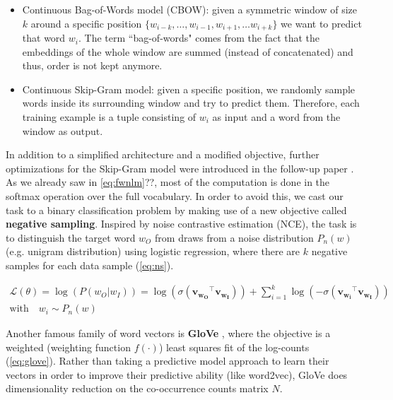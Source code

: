 \begin{itemize}
	\item Continuous Bag-of-Words model (CBOW): given a symmetric window of size $k$ around a specific position $\{w_{i-k}, \ldots , w_{i-1}, w_{i+1}, \ldots w_{i+k}\}$ we want to predict that word $w_i$. The term ``bag-of-words" comes from the fact that the embeddings of the whole window are summed (instead of concatenated) and thus, order is not kept anymore.
	
	\item Continuous Skip-Gram model: given a specific position, we randomly sample words inside its surrounding window and try to predict them. Therefore, each training example is a tuple consisting of $w_i$ as input and a word from the window as output.
\end{itemize}

In addition to a simplified architecture and a modified objective, further optimizations for the Skip-Gram model were introduced in the follow-up paper \cite{mikolov2013distributed}. As we already saw in \autoref{eq:fwnlm}??, most of the computation is done in the softmax operation over the full vocabulary. In order to avoid this, we cast our task to a binary classification problem by making use of a new objective called \textbf{negative sampling}. Inspired by noise contrastive estimation (NCE), the task is to distinguish the target word $w_O$ from draws from a noise distribution $P_n(w)$ (e.g. unigram distribution) using logistic regression, where there are $k$ negative samples for each data sample (\autoref{eq:ns}).

\begin{equation} \label{eq:ns}
	\begin{gathered}
		\mathcal{L}(\theta) = \log(P(w_O|w_I))=\log(\sigma(\mathbf{v_{w_O}}^{\top} \mathbf{v_{w_I}})) + \sum_{i=1}^{k} \log(-\sigma(\mathbf{v_{w_i}}^{\top} \mathbf{v_{w_I}})) \\ 
		\text{with} \quad w_i \sim P_n(w)
	\end{gathered}
\end{equation}

Another famous family of word vectors is \textbf{GloVe} \cite{pennington2014glove}, where the objective is a weighted (weighting function $f(\cdot)$) least squares fit of the log-counts (\autoref{eq:glove}). Rather than taking a predictive model approach to learn their vectors in order to improve their predictive ability (like word2vec), GloVe does dimensionality reduction on the co-occurrence counts matrix $N$. 

